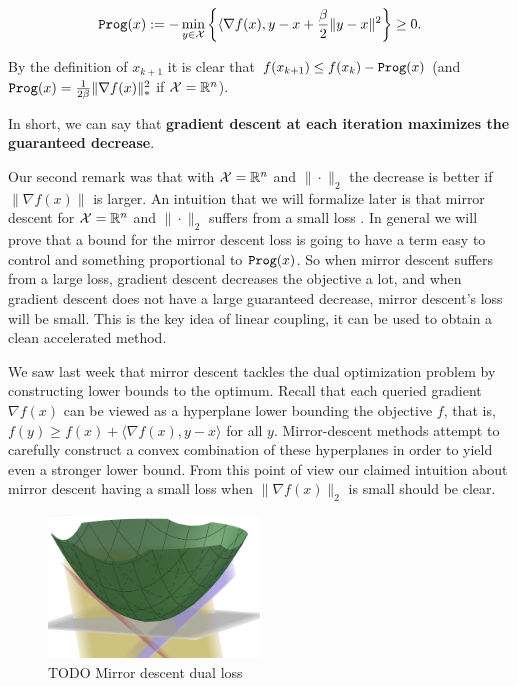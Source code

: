 \[
    {\tt{Prog}}(x) := - \min_{y\in\mathcal{X}} \left\{ \langle \nabla f(x), y-x + \frac{\beta}{2} \|{y-x}\|^2\right\} \geq 0.
\]

By the definition of $x_{k+1}$ it is clear that $f(x_{k+1}) \leq f(x_k) - {\tt{Prog}}(x)$ (and ${\tt{Prog}}(x) = \frac{1}{2\beta} \|\nabla f(x)\|_\ast^2$ if $\mathcal{X} = \mathbb{R}^n$).

In short, we can say that \textbf{gradient descent at each iteration maximizes the guaranteed decrease}. 

Our second remark was that with $\mathcal{X} = \mathbb{R}^n$ and $\|\cdot \|_2$ the decrease is better if $\|\nabla f(x)\|$ is larger. An intuition that we will formalize later is that mirror descent for $\mathcal{X} = \mathbb{R}^n$ and $\|\cdot \|_2$ suffers from a small loss . In general we will prove that a bound for the mirror descent loss is going to have a term easy to control and something proportional to ${\tt{Prog}}(x)$. So when mirror descent suffers from a large loss, gradient descent decreases the objective a lot, and when gradient descent does not have a large guaranteed decrease, mirror descent's loss will be small. This is the key idea of linear coupling, it can be used to obtain a clean accelerated method.

We saw last week that mirror descent tackles the dual optimization problem by constructing lower bounds to the optimum. Recall that each queried gradient $\nabla f(x)$ can be viewed as a hyperplane lower bounding the objective $f$, that is, $f (y) \geq f (x)+ \langle \nabla f (x), y-x \rangle$ for all $y$. Mirror-descent methods attempt to carefully construct a convex combination of these hyperplanes in order to yield even a stronger lower bound. From this point of view our claimed intuition about mirror descent having a small loss when $\|\nabla f(x)\|_2$ is small should be clear. 

\begin{figure}[h!] \label{mirror_descent_dual_loss}
\centering
        \includegraphics[width=0.5\textwidth]{img/mirror_descent_dual_loss} 
        \caption{TODO Mirror descent dual loss}
\end{figure}

